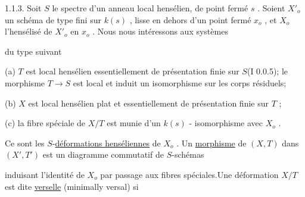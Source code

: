 1.1.3.  Soit $S$ le spectre d'un anneau local hensélien, de point fermé $s$ . Soient $X'_o$ un schéma de type fini sur $k(s)$ , lisse en dehors d'un point fermé $x_o$ , et $X_o$ l'hensélisé de $X'_o$ en $x_o$ . Nous nous intéressons aux systèmes

\begin{center}
\end{center}
du type suivant

(a)  $T$ est local hensélien essentiellement de présentation finie sur $S$(I 0.0.5); le morphisme $T \to S$ est local et induit un isomorphisme sur les corps résiduels;

(b)  $X$ est local hensélien plat et essentiellement de présentation finie sur $T$ ;

(c)  la fibre spéciale de $X/T$ est munie d'un $k(s)$ - isomorphisme avec $X_o$ .

Ce sont les $S$-\underline{déformations henséliennes} de $X_o$ . Un \underline{morphisme} de $(X,T)$ dans $(X',T')$ est un diagramme commutatif de $S$-schémas

\begin{center}
\end{center}
induisant l'identité de $X_o$ par passage aux fibres spéciales.Une déformation $X/T$ est dite \underline{verselle} (minimally versal) si

